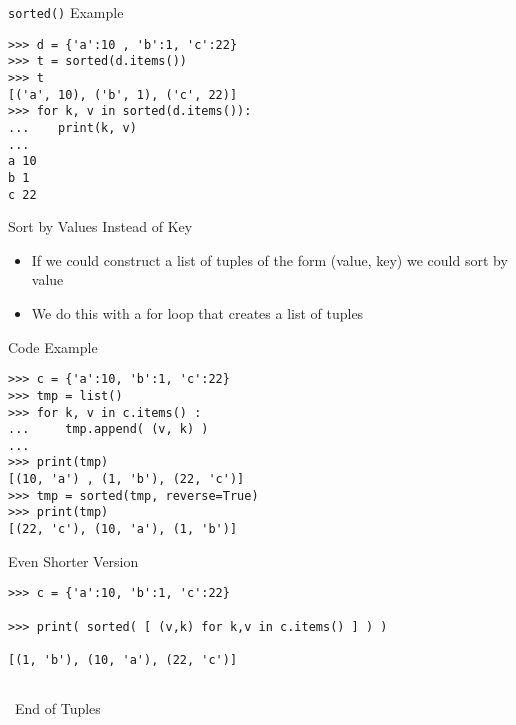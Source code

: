 \documentclass[serif, aspectratio=169]{beamer}
\begin{document}
\begin{frame}[fragile]{\texttt{\color{red}sorted()} Example}
    \begin{lstlisting}
>>> d = {'a':10 , 'b':1, 'c':22}
>>> t = sorted(d.items())
>>> t
[('a', 10), ('b', 1), ('c', 22)]
>>> for k, v in sorted(d.items()):
...    print(k, v)
...
a 10
b 1
c 22
    \end{lstlisting}
\end{frame}

\begin{frame}{Sort by Values Instead of Key}
    \begin{itemize}
        \item If we could construct a list of tuples of the form (value, key) we could sort by value
        \item We do this with a for loop that creates a list of tuples  
        
    \end{itemize}
\end{frame}

\begin{frame}[fragile]{Code Example}
    \begin{lstlisting}
>>> c = {'a':10, 'b':1, 'c':22}
>>> tmp = list()
>>> for k, v in c.items() :
...     tmp.append( (v, k) )
... 
>>> print(tmp)
[(10, 'a') , (1, 'b'), (22, 'c')]
>>> tmp = sorted(tmp, reverse=True)
>>> print(tmp)
[(22, 'c'), (10, 'a'), (1, 'b')]

    \end{lstlisting}
\end{frame}

\begin{frame}[fragile]{Even Shorter Version}
    \begin{lstlisting}   	
>>> c = {'a':10, 'b':1, 'c':22}

>>> print( sorted( [ (v,k) for k,v in c.items() ] ) )

[(1, 'b'), (10, 'a'), (22, 'c')]
 
    \end{lstlisting}
\end{frame}

\begin{frame}
    \begin{center}
        {\Huge\ End of Tuples}
    \end{center}
\end{frame}
\end{document}
